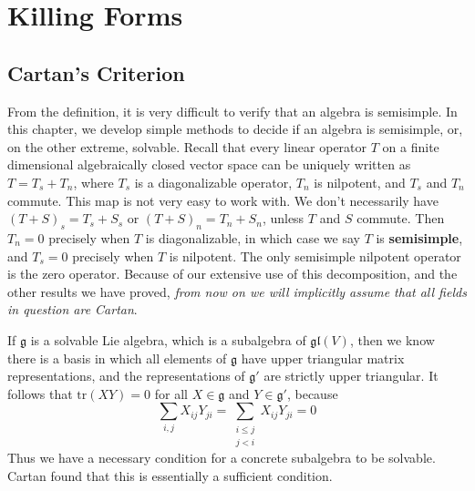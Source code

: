 \chapter{Killing Forms}

\section{Cartan's Criterion}

From the definition, it is very difficult to verify that an algebra is semisimple. In this chapter, we develop simple methods to decide if an algebra is semisimple, or, on the other extreme, solvable. Recall that every linear operator $T$ on a finite dimensional algebraically closed vector space can be uniquely written as $T = T_s + T_n$, where $T_s$ is a diagonalizable operator, $T_n$ is nilpotent, and $T_s$ and $T_n$ commute. This map is not very easy to work with. We don't necessarily have $(T + S)_s = T_s + S_s$ or $(T + S)_n = T_n + S_n$, unless $T$ and $S$ commute. Then $T_n = 0$ precisely when $T$ is diagonalizable, in which case we say $T$ is {\bf semisimple}, and $T_s = 0$ precisely when $T$ is nilpotent. The only semisimple nilpotent operator is the zero operator. Because of our extensive use of this decomposition, and the other results we have proved, {\it from now on we will implicitly assume that all fields in question are Cartan}.

If $\mathfrak{g}$ is a solvable Lie algebra, which is a subalgebra of $\mathfrak{gl}(V)$, then we know there is a basis in which all elements of $\mathfrak{g}$ have upper triangular matrix representations, and the representations of $\mathfrak{g}'$ are strictly upper triangular. It follows that $\text{tr}(XY) = 0$ for all $X \in \mathfrak{g}$ and $Y \in \mathfrak{g}'$, because
%
\[ \sum_{i,j} X_{ij}Y_{ji} = \sum_{\substack{i \leq j\\j < i}} X_{ij} Y_{ji} = 0 \]
%
Thus we have a necessary condition for a concrete subalgebra to be solvable. Cartan found that this is essentially a sufficient condition.

